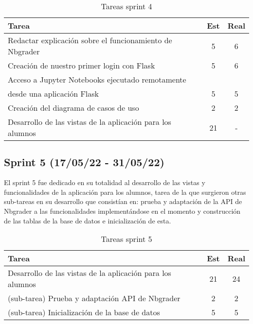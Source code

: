 \begin{table}[h]
\begin{center}
\begin{tabular}{| l | c | c |}
\textbf{Tarea}                   & \textbf{Est} & \textbf{Real} \\ \hline
Redactar explicación sobre el funcionamiento de Nbgrader & 5 & 6 \\
Creación de nuestro primer login con Flask & 5 & 6 \\
Acceso a Jupyter Notebooks ejecutado remotamente & & \\
desde una aplicación Flask & 5 & 5 \\
Creación del diagrama de casos de uso & 2 & 2 \\
Desarrollo de las vistas de la aplicación para los alumnos & 21 & - \\\hline
\end{tabular}
\caption{Tareas sprint 4}
\label{tab:sprint}
\end{center}
\end{table}


\subsection{Sprint 5 (17/05/22 - 31/05/22)}
El sprint 5 fue dedicado en su totalidad al desarrollo de las vistas y funcionalidades de la aplicación para los alumnos, tarea de la que surgieron otras sub-tareas en su desarrollo que consistían en: prueba y adaptación de la API de Nbgrader\cite{tool:NbgraderAPI} a las funcionalidades implementándose en el momento y construcción de las tablas de la base de datos\cite{tool:SQLAlchemy}\cite{tool:SQLite} e inicialización de esta.



\begin{table}[h]
\begin{center}
\begin{tabular}{| l | c | c |}
\textbf{Tarea}                   & \textbf{Est} & \textbf{Real} \\ \hline
Desarrollo de las vistas de la aplicación para los alumnos & 21 & 24 \\
  (sub-tarea) Prueba y adaptación API de Nbgrader & 2 & 2 \\
  (sub-tarea) Inicialización de la base de datos & 5 & 5 \\\hline
\end{tabular}
\caption{Tareas sprint 5}
\label{tab:sprint}
\end{center}
\end{table}

